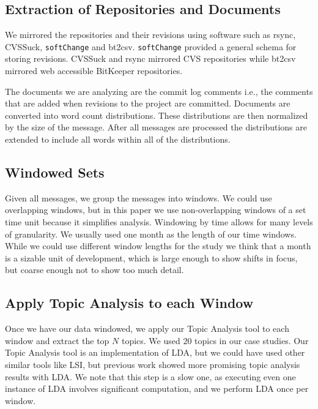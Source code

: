 \documentclass[times, 10pt,twocolumn]{article}
\newcommand{\shrinkit}{\vspace*{-.3em}}
\begin{document}
\shrinkit
\subsection{Extraction of  Repositories and Documents}
\shrinkit

We mirrored the repositories and their revisions using software such
as rsync, CVSSuck, \texttt{softChange} and bt2csv.
\texttt{softChange} provided a general schema for storing
revisions. CVSSuck and rsync mirrored CVS repositories while bt2csv
mirrored web accessible BitKeeper repositories.

The documents we are analyzing are the commit log comments i.e., the
comments that are added when revisions to the project are committed.
Documents are converted into word count distributions. These
distributions are then normalized by the size of the message. After
all messages are processed the distributions are extended to include
all words within all of the  distributions.

\shrinkit
\subsection{Windowed Sets}
\shrinkit

Given all messages, we group the messages into windows. We could use
overlapping windows, but in this paper we use non-overlapping windows
of a set time unit because it simplifies analysis.  Windowing by time
allows for many levels of granularity.  We usually used one month as
the length of our time windows. While we could use different window
lengths for the study we think that a month is a sizable unit of
development, which is large enough to show shifts in focus, but coarse
enough not to show too much detail.

\shrinkit
\subsection{Apply Topic Analysis to each Window}
\shrinkit

Once we have our data windowed, we apply our Topic Analysis tool to
each window and extract the top $N$ topics. We used $20$
topics in our case studies. Our Topic Analysis tool is an
implementation of LDA, but we could have used other similar tools like
LSI, but previous work showed more promising topic analysis results
with LDA.  We note that this step is a slow one, as executing even one
instance of LDA involves significant computation, and we perform LDA
once per window.
\end{document}

